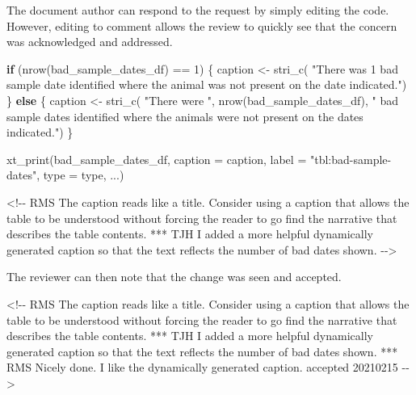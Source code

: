 \documentclass[
]{article}
\newenvironment{Shaded}{\begin{snugshade}}{\end{snugshade}}
\newcommand{\AttributeTok}[1]{\textcolor[rgb]{0.77,0.63,0.00}{#1}}
\newcommand{\ControlFlowTok}[1]{\textcolor[rgb]{0.13,0.29,0.53}{\textbf{#1}}}
\newcommand{\DecValTok}[1]{\textcolor[rgb]{0.00,0.00,0.81}{#1}}
\newcommand{\FunctionTok}[1]{\textcolor[rgb]{0.00,0.00,0.00}{#1}}
\newcommand{\NormalTok}[1]{#1}
\newcommand{\OtherTok}[1]{\textcolor[rgb]{0.56,0.35,0.01}{#1}}
\newcommand{\SpecialCharTok}[1]{\textcolor[rgb]{0.00,0.00,0.00}{#1}}
\newcommand{\StringTok}[1]{\textcolor[rgb]{0.31,0.60,0.02}{#1}}
\begin{document}
The document author can respond to the request by simply editing the
code. However, editing to comment allows the review to quickly see that
the concern was acknowledged and addressed.

\begin{Shaded}
\begin{Highlighting}[]
    \ControlFlowTok{if}\NormalTok{ (}\FunctionTok{nrow}\NormalTok{(bad\_sample\_dates\_df) }\SpecialCharTok{==} \DecValTok{1}\NormalTok{) \{}
\NormalTok{      caption }\OtherTok{\textless{}{-}} \FunctionTok{stri\_c}\NormalTok{(}
        \StringTok{"There was 1 bad sample date identified where the animal was not}
\StringTok{        present on the date indicated."}\NormalTok{)}
\NormalTok{    \} }\ControlFlowTok{else}\NormalTok{ \{}
\NormalTok{      caption }\OtherTok{\textless{}{-}} \FunctionTok{stri\_c}\NormalTok{(}
        \StringTok{"There were "}\NormalTok{, }\FunctionTok{nrow}\NormalTok{(bad\_sample\_dates\_df), }\StringTok{" bad sample dates identified}
\StringTok{        where the animals were not present on the dates indicated."}\NormalTok{)}
\NormalTok{    \}}

    \FunctionTok{xt\_print}\NormalTok{(bad\_sample\_dates\_df, }\AttributeTok{caption =}\NormalTok{ caption,}
             \AttributeTok{label =} \StringTok{"tbl:bad{-}sample{-}dates"}\NormalTok{, }\AttributeTok{type =}\NormalTok{ type, ...)}
  


\StringTok{\textasciigrave{}}\AttributeTok{\textless{}!{-}{-} RMS The caption reads like a title. Consider using a caption that allows}
\AttributeTok{the table to be understood without forcing the reader to go find the }
\AttributeTok{narrative that describes the table contents.}
\AttributeTok{*** TJH I added a more helpful dynamically generated caption so that the text }
\AttributeTok{reflects the number of bad dates shown.}
\AttributeTok{{-}{-}\textgreater{}}\StringTok{\textasciigrave{}}
\end{Highlighting}
\end{Shaded}

The reviewer can then note that the change was seen and accepted.

\begin{Shaded}
\begin{Highlighting}[]
\StringTok{\textasciigrave{}}\AttributeTok{\textless{}!{-}{-} RMS The caption reads like a title. Consider using a caption that allows}
\AttributeTok{the table to be understood without forcing the reader to go find the }
\AttributeTok{narrative that describes the table contents.}
\AttributeTok{*** TJH I added a more helpful dynamically generated caption so that the text }
\AttributeTok{reflects the number of bad dates shown.}
\AttributeTok{*** RMS Nicely done. I like the dynamically generated caption.}
\AttributeTok{accepted 20210215}
\AttributeTok{{-}{-}\textgreater{}}\StringTok{\textasciigrave{}}
\end{Highlighting}
\end{Shaded}
\end{document}
